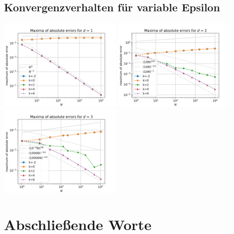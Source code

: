 \documentclass{scrartcl}
\begin{document}
\pagebreak
\subsection{Konvergenzverhalten für variable Epsilon}


{
  \centering
    \includegraphics[width=0.45\textwidth]{Grafiken/epsilon_d1}
    \includegraphics[width=0.45\textwidth]{Grafiken/epsilon_d2}
    \includegraphics[width=0.45\textwidth]{Grafiken/epsilon_d3}
    \vspace{-0.2cm}
}
\vspace{0.5cm}


\pagebreak
\section{Abschließende Worte}
\end{document}
